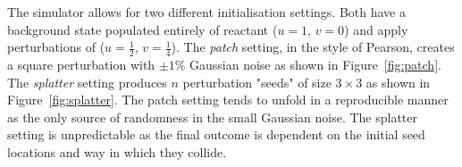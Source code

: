 The simulator allows for two different initialisation settings. Both have a background state populated entirely of reactant ($u=1$, $v = 0$) and apply perturbations of ($u=\frac{1}{2}$, $v = \frac{1}{4}$). The \textit{patch} setting, in the style of Pearson\cite{pearson1993complex}, creates a square perturbation with $\pm1\%$ Gaussian noise as shown in Figure~\ref{fig:patch}. The \textit{splatter} setting produces $n$ perturbation "seeds" of size $3\times3$ as shown in Figure~\ref{fig:splatter}. The patch setting tends to unfold in a reproducible manner as the only source of randomness in the small Gaussian noise. The splatter setting is unpredictable as the final outcome is dependent on the initial seed locations and way in which they collide.
\begin{figure}[!h]
\centering
            \hfill
            \hfill
            \hfill
            \hfill

\end{figure}
